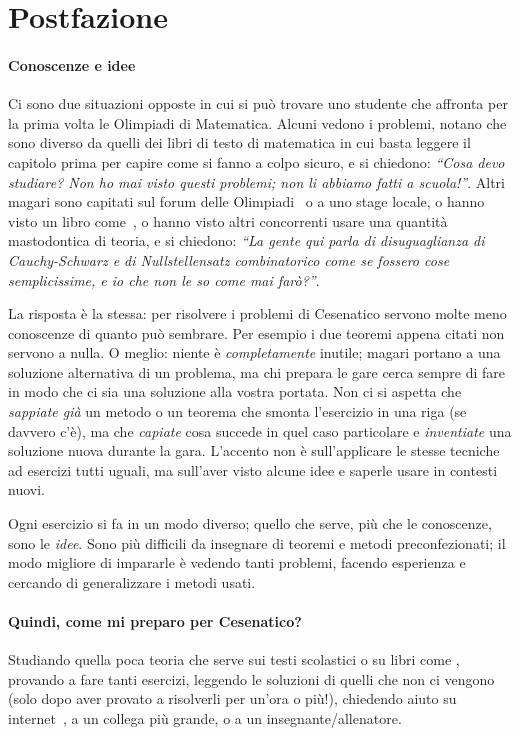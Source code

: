 \documentclass[a4paper,10pt]{paper}
\begin{document}
\section{Postfazione}
 
\paragraph{Conoscenze e idee} Ci sono due situazioni opposte in cui si può trovare uno studente che affronta per la prima volta le Olimpiadi di Matematica. Alcuni vedono i problemi, notano che sono diverso da quelli dei libri di testo di matematica in cui basta leggere il capitolo prima per capire come si fanno a colpo sicuro, e si chiedono: \emph{``Cosa devo studiare? Non ho mai visto questi problemi; non li abbiamo fatti a scuola!''}. Altri magari sono capitati sul forum delle Olimpiadi~\cite{oliforum} o a uno stage locale, o hanno visto un libro come~\cite{schedeolimpiche}, o hanno visto altri concorrenti usare una quantità mastodontica di teoria, e si chiedono: \emph{``La gente qui parla di disuguaglianza di Cauchy-Schwarz e di Nullstellensatz combinatorico come se fossero cose semplicissime, e io che non le so come mai farò?''}.
 
 La risposta è la stessa: per risolvere i problemi di Cesenatico servono molte meno conoscenze di quanto può sembrare. Per esempio i due teoremi appena citati non servono a nulla. O meglio: niente è \emph{completamente} inutile; magari portano a una soluzione alternativa di un problema, ma chi prepara le gare cerca sempre di fare in modo che ci sia una soluzione alla vostra portata. Non ci si aspetta che \emph{sappiate già} un metodo o un teorema che smonta l'esercizio in una riga (se davvero c'è), ma che \emph{capiate} cosa succede in quel caso particolare e \emph{inventiate} una soluzione nuova durante la gara. L'accento non è sull'applicare le stesse tecniche ad esercizi tutti uguali, ma sull'aver visto alcune idee e saperle usare in contesti nuovi.
 
 Ogni esercizio si fa in un modo diverso; quello che serve, più che le conoscenze, sono le \emph{idee}. Sono più difficili da insegnare di teoremi e metodi preconfezionati; il modo migliore di impararle è vedendo tanti problemi, facendo esperienza e cercando di generalizzare i metodi usati. 

\paragraph{Quindi, come mi preparo per Cesenatico?}
Studiando quella poca teoria che serve sui testi scolastici o su libri come \cite{culipiccoli,dispenseudine,paolini}, provando a fare tanti esercizi, leggendo le soluzioni di quelli che non ci vengono (solo dopo aver provato a risolverli per un'ora o più!), chiedendo aiuto su internet~\cite{oliforum}, a un collega più grande, o a un insegnante/allenatore.
 
\end{document}
